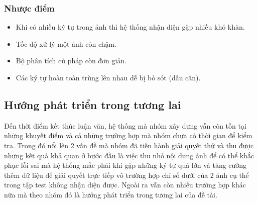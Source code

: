 \documentclass[a4paper]{article}
\theoremstyle{definition}
\begin{document}
	\subsubsection{Nhược điểm}
	
	\begin{itemize}
		\item Khi có nhiều ký tự trong ảnh thì hệ thống nhận diện gặp nhiều khó khăn.
		\item Tốc độ xử lý một ảnh còn chậm.
		\item Bộ phân tích cú pháp còn đơn giản.
		\item Các ký tự hoàn toàn trùng lên nhau dễ bị bỏ sót (dấu căn).
	\end{itemize}
	\subsection{Hướng phát triển trong tương lai}
	Đến thời điểm kết thúc luận văn, hệ thống mà nhóm xây dựng vẫn còn tồn tại những khuyết điểm và cả những trường hợp mà nhóm chưa có thời gian để kiểm tra. Trong đó nổi lên 2 vấn đề mà nhóm đã tiến hành giải quyết thử và thu được những kết quả khả quan ở bước đầu là việc thu nhỏ nội dung ảnh để có thể khắc phục lỗi sai mà hệ thống mắc phải khi gặp những ký tự quá lớn và tăng cường thêm dữ liệu để giải quyết trực tiếp vô trường hợp chỉ số dưới của 2 ảnh cụ thể trong tập test không nhận diện được. Ngoài ra vẫn còn nhiều trường hợp khác nữa mà theo nhóm đó là hướng phát triển trong tương lai của đề tài. 
	
\end{document}
